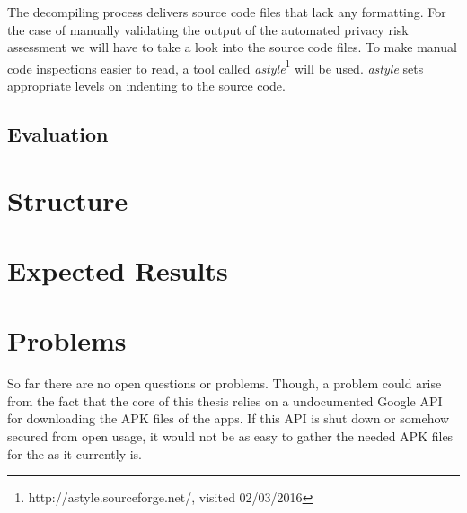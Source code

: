 \documentclass[
	a4paper,
	oneside,
	12pt,
	liststotocnumbered
]{article}
\begin{document}
The decompiling process delivers source code files that lack any formatting.
For the case of manually validating the output of the automated privacy risk assessment we will have to take a look into the source code files. 
To make manual code inspections easier to read, a tool called \textit{astyle}\footnote{http://astyle.sourceforge.net/, visited 02/03/2016} will be used. 
\textit{astyle} sets appropriate levels on indenting to the source code.



\subsection{Evaluation}

\section{Structure}

\section{Expected Results}

\section{Problems}
So far there are no open questions or problems. Though, a problem could arise from the fact that the core of this thesis relies on a undocumented Google \acs{API} for downloading the \acs{APK} files of the apps. 
If this \acs{API} is shut down or somehow secured from open usage, it would not be as easy to gather the needed \acs{APK} files for the \sca as it currently is.

\newpage
\printbibliography[title={References}]
\end{document}
